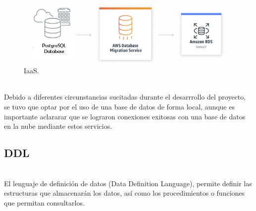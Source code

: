 \documentclass[12pt,letterpaper]{article}
\begin{document}
	\begin{figure}[H]
		\centering
		\includegraphics[width=\linewidth]{Documentacion/img/iaas.PNG}
		\caption{IaaS.}
	\end{figure}
	\\Debido a diferentes circunstancias sucitadas durante el desarrrollo del proyecto, se tuvo que optar por el uso de una base de datos de forma local, aunque es importante aclararar que se lograron conexiones exitosas con una base de datos en la nube mediante estos servicios.\\
	
	\subsection{DDL}
	\\El lenguaje de definición de datos (Data Definition Language), permite definir las estructuras que almacenarán los datos, así como los procedimientos o funciones que permitan consultarlos.
	
\end{document}
